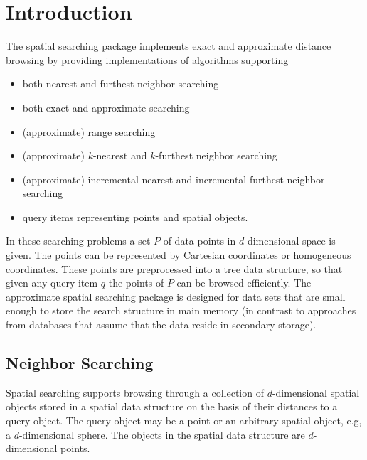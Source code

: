 


\section{Introduction}

The spatial searching package implements exact and approximate
distance browsing by providing implementations of algorithms
supporting

\begin{itemize} 

\item
both nearest and furthest neighbor searching

\item
both exact and approximate searching

\item
(approximate) range searching

\item 
(approximate) $k$-nearest and $k$-furthest neighbor searching

\item 
(approximate) incremental nearest and incremental furthest neighbor searching

\item
query items representing points and spatial objects.

\end{itemize}

In these searching problems a set $P$ of data points in
$d$-dimensional space is given.  The points can be represented by
Cartesian coordinates or homogeneous coordinates.  These points are
preprocessed into a tree data structure, so that given any
query item $q$ the points of $P$ can be browsed efficiently.  The
approximate spatial searching package is designed for data sets that
are small enough to store the search structure in main memory (in
contrast to approaches from databases that assume that the data reside
in secondary storage).

\subsection{Neighbor Searching}

Spatial searching supports browsing through a collection of
$d$-dimensional spatial objects stored in a spatial data structure on
the basis of their distances to a query object. The query object may
be a point or an arbitrary spatial object, e.g, a $d$-dimensional
sphere. The objects in the spatial data structure are $d$-dimensional
points.

